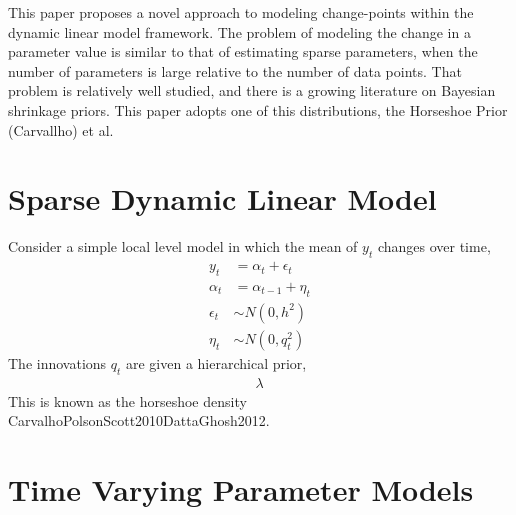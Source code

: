 \documentclass{article}
\begin{document}
This paper proposes a novel approach to modeling change-points within the dynamic linear model framework.
The problem of modeling the change in a parameter value is similar to that of estimating sparse parameters, when the number of parameters is large relative to the number of data points.
That problem is relatively well studied, and there is a growing literature on Bayesian shrinkage priors.
This paper adopts one of this distributions, the Horseshoe Prior (Carvallho) et al. 

\section{Sparse Dynamic Linear Model}

Consider a simple local level model in which the mean of $y_{t}$ changes over time,
\begin{align}
  \label{eq:8}
  y_t &= \alpha_t + \epsilon_t \\
  \alpha_t &= \alpha_{t-1} + \eta_{t} \\
  \epsilon_{t} &\sim N(0, h^{2}) \\
  \eta_{t} &\sim N(0, q_{t}^{2})
\end{align}
The innovations $q_{t}$ are given a hierarchical prior,
\begin{align}
  \label{eq:4}
  \lambda^{}
\end{align}
This is known as the horseshoe density \textcite{CarvalhoPolsonScott2009}{CarvalhoPolsonScott2010}{DattaGhosh2012}.


\section{Time Varying Parameter Models}
\label{sec:time-vary-param}

\end{document}
